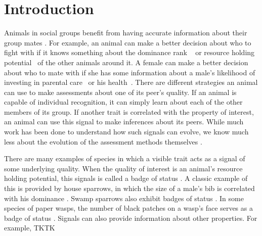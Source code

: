 \section*{Introduction} 
Animals in social groups benefit from having accurate information about their group mates \citep{Seyfarth:2010bh}. For example, an animal can make a better decision about who to fight with if it knows something about the dominance rank ~\citep{Waal:1986ys,Cowlishaw:1990vn,Bergman:2003qf,Seyfarth:2005ve,Flack:2006uq,Hobson:2015uq} or resource holding potential~\citep{Rhijn:1980uq,Freeman:1985kl,Dick:1990cr,Lemel:1993ve} of the other animals around it. A female can  make a better decision about who to mate with if she has some information about a male's likelihood of investing in parental care~\citep{Qvarnstrom:1997fk,Olsen:2010uq} or his health~\citep{Folstad:1992kx,Loyau:2005nx}. There are different strategies an animal can use to make assessments about one of its peer's quality. If an animal is capable of individual recognition, it can simply learn about each of the other members of its group. If another trait is correlated with the property of interest, an animal can use this signal to make inferences about its peers. While much work has been done to understand how such signals can evolve, we know much less about the evolution of the assessment methods themselves \citep{sheehan2016evotradeoff}.


There are many examples of species in which a visible trait acts as a signal of some underlying quality. When the quality of interest is an animal's resource holding potential, this signals is called a badge of status \citep{dawkins1978signals,Rohwer:1981vn,Rohwer:1982fk,Ripoll:2004vn,sheehan2016evotradeoff}. A classic example of this is provided by house sparrows, in which the size of a male's bib is correlated with his dominance \citep{Veiga:1993fk}. Swamp sparrows also exhibit badges of status \citep{Olsen:2010uq}. In some species of paper wasps, the number of black patches on a wasp's face serves as a badge of status \citep{Tibbetts:2004kx}. Signals can also provide information about other properties. For example, TKTK 


